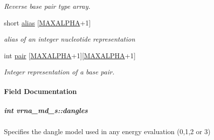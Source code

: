 \begin{DoxyCompactItemize}
\begin{DoxyCompactList}\small\item\em Reverse base pair type array. \end{DoxyCompactList}\item 
short \hyperlink{group__model__details_a66136cf9abc8ff790ec0d33245d68fd5}{alias} \mbox{[}\hyperlink{group__model__details_ga05a5ffe718aa431d97419a12fb082379}{M\+A\+X\+A\+L\+P\+HA}+1\mbox{]}\hypertarget{group__model__details_a66136cf9abc8ff790ec0d33245d68fd5}{}\label{group__model__details_a66136cf9abc8ff790ec0d33245d68fd5}

\begin{DoxyCompactList}\small\item\em alias of an integer nucleotide representation \end{DoxyCompactList}\item 
int \hyperlink{group__model__details_ab4da594c638707e212f64aadb54a7454}{pair} \mbox{[}\hyperlink{group__model__details_ga05a5ffe718aa431d97419a12fb082379}{M\+A\+X\+A\+L\+P\+HA}+1\mbox{]}\mbox{[}\hyperlink{group__model__details_ga05a5ffe718aa431d97419a12fb082379}{M\+A\+X\+A\+L\+P\+HA}+1\mbox{]}\hypertarget{group__model__details_ab4da594c638707e212f64aadb54a7454}{}\label{group__model__details_ab4da594c638707e212f64aadb54a7454}

\begin{DoxyCompactList}\small\item\em Integer representation of a base pair. \end{DoxyCompactList}\end{DoxyCompactItemize}


\paragraph{Field Documentation}
\subparagraph[{\texorpdfstring{dangles}{dangles}}]{\setlength{\rightskip}{0pt plus 5cm}int vrna\+\_\+md\+\_\+s\+::dangles}\hypertarget{group__model__details_adcda4ff2ea77748ae0e8700288282efc}{}\label{group__model__details_adcda4ff2ea77748ae0e8700288282efc}


Specifies the dangle model used in any energy evaluation (0,1,2 or 3) 


